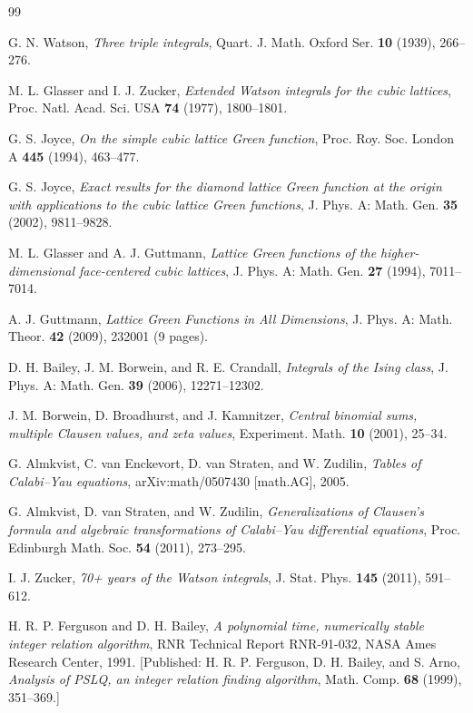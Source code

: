\documentclass[12pt,a4paper]{article}
\numberwithin{equation}{section}
\theoremstyle{plain}
\theoremstyle{definition}
\theoremstyle{remark}
\begin{document}
\begin{thebibliography}{99}

G. N. Watson,
\emph{Three triple integrals},
Quart. J. Math. Oxford Ser. \textbf{10} (1939), 266--276.

M. L. Glasser and I. J. Zucker,
\emph{Extended Watson integrals for the cubic lattices},
Proc. Natl. Acad. Sci. USA \textbf{74} (1977), 1800--1801.

G. S. Joyce,
\emph{On the simple cubic lattice Green function},
Proc. Roy. Soc. London A \textbf{445} (1994), 463--477.

G. S. Joyce,
\emph{Exact results for the diamond lattice Green function at the origin with applications to the
  cubic lattice Green functions},
J. Phys. A: Math. Gen. \textbf{35} (2002), 9811--9828.

M. L. Glasser and A. J. Guttmann,
\emph{Lattice Green functions of the higher-dimensional face-centered cubic lattices},
J. Phys. A: Math. Gen. \textbf{27} (1994), 7011--7014.

A. J. Guttmann,
\emph{Lattice Green Functions in All Dimensions},
J. Phys. A: Math. Theor. \textbf{42} (2009), 232001 (9 pages).

D. H. Bailey, J. M. Borwein, and R. E. Crandall,
\emph{Integrals of the Ising class},
J. Phys. A: Math. Gen. \textbf{39} (2006), 12271--12302.

J. M. Borwein, D. Broadhurst, and J. Kamnitzer,
\emph{Central binomial sums, multiple Clausen values, and zeta values},
Experiment. Math. \textbf{10} (2001), 25--34.

G. Almkvist, C. van Enckevort, D. van Straten, and W. Zudilin,
\emph{Tables of Calabi--Yau equations},
arXiv:math/0507430 [math.AG], 2005.

G. Almkvist, D. van Straten, and W. Zudilin,
\emph{Generalizations of Clausen's formula and algebraic transformations of Calabi--Yau differential equations},
Proc. Edinburgh Math. Soc. \textbf{54} (2011), 273--295.

I. J. Zucker,
\emph{70+ years of the Watson integrals},
J. Stat. Phys. \textbf{145} (2011), 591--612.

H. R. P. Ferguson and D. H. Bailey,
\emph{A polynomial time, numerically stable integer relation algorithm},
RNR Technical Report RNR-91-032, NASA Ames Research Center, 1991.
[Published: H. R. P. Ferguson, D. H. Bailey, and S. Arno,
\emph{Analysis of PSLQ, an integer relation finding algorithm},
Math. Comp. \textbf{68} (1999), 351--369.]


\end{thebibliography}
\end{document}
